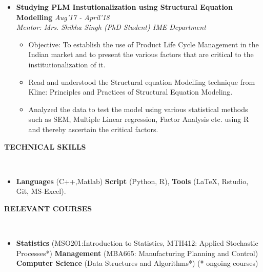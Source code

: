 \documentclass{article}
\newcommand{\isep}{-2 pt}
\newcommand{\lsep}{-0.5cm}
\newcommand{\resheading}[1]{{\small \colorbox{mygrey}{\begin{minipage}{0.975\textwidth}{\textbf{#1 \vphantom{p\^{E}}}}\end{minipage}}}}
\begin{document}
\begin{itemize}
\item \textbf{Studying PLM Instutionalization using Structural Equation Modelling } \hskip 3cm\textit{Aug'17 - April'18}\\
 \emph{Mentor: Mrs. Shikha Singh (PhD Student) IME Department} \\[-0.6cm]
	\begin{itemize}\itemsep \isep
	\item Objective: To establish the use of Product Life Cycle Management in the Indian market and to present the various factors that are critical to the institutionalization of it.
	\item Read and understood the Structural equation Modelling technique from Kline: Principles and Practices of Structural Equation Modeling. 
	\item Analyzed the data to test the model using various statistical methods such as SEM, Multiple Linear regression, Factor Analysis etc. using R and thereby ascertain the critical factors.
\end{itemize}
\end{itemize}

\resheading{\textbf{TECHNICAL SKILLS} }\\[\lsep]
\begin{itemize}
\item \indent\textbf{Languages} (C++,Matlab)
      \indent\textbf{Script} (Python, R), 
      \indent\textbf{Tools} (\LaTeX, Rstudio, Git, MS-Excel).
\end{itemize}

\resheading{\textbf{RELEVANT COURSES} }\\[\lsep]
\begin{itemize}
\item \indent\textbf{Statistics} (MSO201:Introduction to Statistics, MTH412: Applied Stochastic Processes*)
      \indent\textbf{Management} (MBA665: Manufacturing Planning and Control)
      \indent\textbf{Computer Science} (Data Structures and Algorithms*)
      \newline (* ongoing courses)
\end{itemize}
\end{document}

